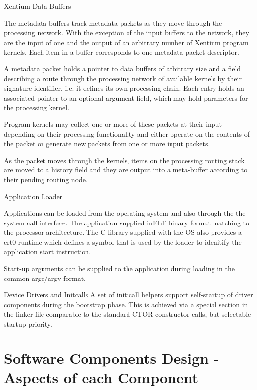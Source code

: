 %
{Xentium Data Buffers}{%
The metadata buffers track metadata packets as they move through the processing
network. With the exception of the input buffers to the network, they are
the input of one and the output of an arbitrary number of \gls{Xentium} program
kernels. Each item in a buffer corresponds to one metadata packet descriptor.
\newline

A metadata packet holds a pointer to data buffers of arbitrary size and a
field describing a route through the processing network of available kernels
by their signature identifier, i.e. it defines its own processing chain.
Each entry holds an associated pointer to an optional argument field, which may
hold parameters for the processing kernel. \newline

Program kernels may collect one or more of these packets at their input
depending on their processing functionality and either operate on the contents
of the packet or generate new packets from one or more input packets.
\newline

As the packet moves through the kernels, items on the processing routing 
stack are moved to a history field and they are output into a meta-buffer
according to their pending routing node.
}%
{}{}


%
{Application Loader}{%
Applications can be loaded from the operating system and also through
the the system call interface. The application supplied in\gls{ELF} binary format
matching to the processor architecture. The C-library supplied with the OS
also provides a crt0 runtime which defines a symbol that is used by the loader
to idenitify the application start instruction.

Start-up arguments can be supplied to the application during loading in the
common argc/argv format.
}%
{}{}


%
{Device Drivers and Initcalls}{%
A set of initicall helpers support self-startup of driver components during
the bootstrap phase. This is achieved via a special section in the linker
file comparable to the standard CTOR constructor calls, but selectable
startup priority.
}%
{}{}


\section{Software Components Design - Aspects of each Component}


